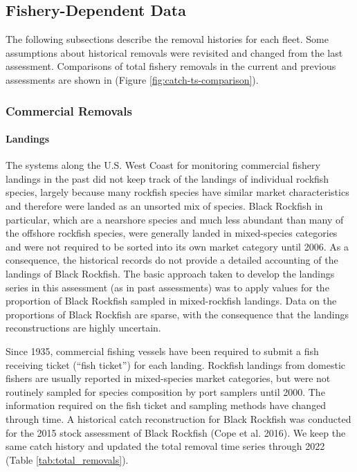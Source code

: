 \documentclass[11pt,
  english,
  letterpaper,
]{article}
\begin{document}
\hypertarget{fishery-dependent-data}{%
\subsection{Fishery-Dependent Data}\label{fishery-dependent-data}}

The following subsections describe the removal histories for each fleet. Some assumptions about historical removals were revisited and changed from the last assessment. Comparisons of total fishery removals in the current and previous assessments are shown in (Figure \ref{fig:catch-ts-comparison}).

\hypertarget{commercial-removals}{%
\subsubsection{Commercial Removals}\label{commercial-removals}}

\hypertarget{com-landings}{%
\paragraph{Landings}\label{com-landings}}

The systems along the U.S. West Coast for monitoring commercial fishery landings in the past did not keep track of the landings of individual rockfish species, largely because many rockfish species have similar market characteristics and therefore were landed as an unsorted mix of species. Black Rockfish in particular, which are a nearshore species and much less abundant than many of the offshore rockfish species, were generally landed in mixed-species categories and were not required to be sorted into its own market category until 2006. As a consequence, the historical records do not provide a detailed accounting of the landings of Black Rockfish. The basic approach taken to develop the landings series in this assessment (as in past assessments) was to apply values for the proportion of Black Rockfish sampled in mixed-rockfish landings. Data on the proportions of Black Rockfish are sparse, with the consequence that the landings reconstructions are highly uncertain.

Since 1935, commercial fishing vessels have been required to submit a fish receiving ticket (``fish ticket'') for each landing. Rockfish landings from domestic fishers are usually reported in mixed-species market categories, but were not routinely sampled for species composition by port samplers until 2000. The information required on the fish ticket and sampling methods have changed through time. A historical catch reconstruction for Black Rockfish was conducted for the 2015 stock assessment of Black Rockfish (Cope et al. 2016). We keep the same catch history and updated the total removal time series through 2022 (Table \ref{tab:total_removals}).
\end{document}
